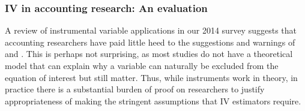 \documentclass[12pt,reqno,titlepage]{amsart}
\begin{document}
\begin{doublespace}
\subsubsection{IV in accounting research: An evaluation}
A review of instrumental variable applications in our 2014 survey suggests that accounting researchers have paid little heed to the suggestions and warnings of  \citet{Larcker:2010fq,Lennox:2012it} and \citet{Roberts:2013cz}.
This is perhaps not surprising, as most studies do not have a theoretical model that can explain why a variable can naturally be excluded from
the equation of interest but still matter. 
Thus, while instruments work in theory, in practice there is a substantial burden of proof on researchers to justify appropriateness of making the stringent assumptions that IV estimators require.
 

\end{doublespace}
\end{document}
